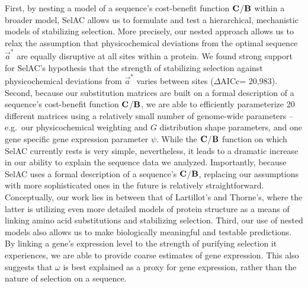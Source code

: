 \documentclass[12pt,letterpaper,fleqn]{article}
\newcommand{\PC}{physicochemical\xspace}
\newcommand{\Cost}{\ensuremath{\text{\textbf{C}}}\xspace}
\newcommand{\DeltaAICc}{\ensuremath{\Delta\text{AICc}}\xspace}
\newcommand{\Func}{\ensuremath{\text{\textbf{B}}}\xspace}
\newcommand{\selac}{SelAC\xspace}
\newcommand{\aoptvec}{\ensuremath{\Vec{a}^*}\xspace}
\begin{document}
First, by nesting a model of a sequence's cost-benefit function \Cost/\Func within a broader model, \selac allows us to formulate and test a hierarchical, mechanistic models of stabilizing selection.
More precisely, our nested approach allows us to relax the assumption that \PC deviations from the optimal sequence \aoptvec are equally disruptive at all sites within a protein.
We found strong support for \selac's hypothesis that the strength of stabilizing selection against \PC deviations from \aoptvec varies between sites (\DeltaAICc = 20,983).
Second, because our substitution matrices are built on a formal description of a sequence's cost-benefit function \Cost/\Func, we are able to efficiently parameterize 20 different matrices using a relatively small number of genome-wide parameters -- e.g.~our \PC weighting and $G$ distribution shape parameters, and one gene specific gene expression parameter $\psi$.
While the \Cost/\Func function on which \selac currently rests is very simple, nevertheless, it leads to a dramatic increase in our ability to explain the sequence data we analyzed.
Importantly, because \selac uses a formal description of a sequence's \Cost/\Func,  replacing our assumptions with more sophisticated ones in the future is relatively straightforward.
Conceptually, our work lies in between that of Lartillot's and Thorne's, where the latter is utilizing even more detailed models of protein structure as a means of linking amino acid substitutions and stabilizing selection.
Third, our use of nested models also allows us to make biologically meaningful and testable predictions. By linking a gene's expression level to the strength of purifying selection it experiences, we are able to provide coarse estimates of gene expression. This also suggests that $\omega$ is best explained as a proxy for gene expression, rather than the nature of selection on a sequence.
\end{document}
